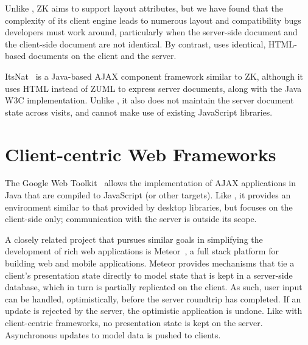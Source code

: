 Unlike \projectname{}, ZK aims to support layout attributes, but
we have found that the complexity of its client engine leads to 
numerous layout and compatibility bugs developers must work around,
particularly when the server-side document and the client-side
document are not identical.  By contrast, \cb uses identical, HTML-based
documents on the client and the server.

ItsNat~\cite{JoseMariaArranzSantamariaItsNat} is a Java-based AJAX
component framework similar to ZK, although it uses HTML instead of
ZUML to express server documents, along with the Java W3C implementation.  
Unlike \projectname, it also does not maintain the server document 
state across visits, and cannot make use of existing JavaScript libraries.







\section{Client-centric Web Frameworks}

The Google Web Toolkit~\cite{GWT} allows the implementation of
AJAX applications in Java that are compiled to JavaScript (or other
targets).  Like \projectname, it provides an environment similar to 
that provided by desktop libraries, but focuses on the client-side only; 
communication with the server is outside its scope.

A closely related project that pursues similar goals in simplifying the development
of rich web applications is Meteor~\cite{meteor}, a full stack platform for building 
web and mobile applications.  Meteor provides mechanisms that tie a client's presentation
state directly to model state that is kept in a server-side database, which in turn is 
partially replicated on the client.  As such, user input can be handled, optimistically, before 
the server roundtrip has completed. If an update is rejected by the server, the optimistic 
application is undone. Like with client-centric frameworks, no presentation state is kept on
the server. Asynchronous updates to model data is pushed to clients.

